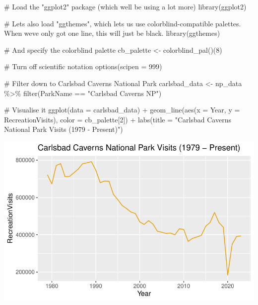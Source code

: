 \documentclass[
  letterpaper,
  DIV=11,
  numbers=noendperiod]{scrartcl}
\newenvironment{Shaded}{\begin{snugshade}}{\end{snugshade}}
\newcommand{\AttributeTok}[1]{\textcolor[rgb]{0.40,0.45,0.13}{#1}}
\newcommand{\CommentTok}[1]{\textcolor[rgb]{0.37,0.37,0.37}{#1}}
\newcommand{\DecValTok}[1]{\textcolor[rgb]{0.68,0.00,0.00}{#1}}
\newcommand{\FunctionTok}[1]{\textcolor[rgb]{0.28,0.35,0.67}{#1}}
\newcommand{\NormalTok}[1]{\textcolor[rgb]{0.00,0.23,0.31}{#1}}
\newcommand{\OtherTok}[1]{\textcolor[rgb]{0.00,0.23,0.31}{#1}}
\newcommand{\SpecialCharTok}[1]{\textcolor[rgb]{0.37,0.37,0.37}{#1}}
\newcommand{\StringTok}[1]{\textcolor[rgb]{0.13,0.47,0.30}{#1}}
\begin{document}
\begin{Shaded}
\begin{Highlighting}[]
\CommentTok{\# Load the "ggplot2" package (which we\textquotesingle{}ll be using a lot more)}
\FunctionTok{library}\NormalTok{(ggplot2)}

\CommentTok{\# Let\textquotesingle{}s also load "ggthemes", which let\textquotesingle{}s us use colorblind{-}compatible palettes. When we\textquotesingle{}ve only got one line, this will just be black.}
\FunctionTok{library}\NormalTok{(ggthemes)}

\CommentTok{\# And specify the colorblind palette}
\NormalTok{cb\_palette }\OtherTok{\textless{}{-}} \FunctionTok{colorblind\_pal}\NormalTok{()(}\DecValTok{8}\NormalTok{)}

\CommentTok{\# Turn off scientific notation}
\FunctionTok{options}\NormalTok{(}\AttributeTok{scipen =} \DecValTok{999}\NormalTok{)}

\CommentTok{\# Filter down to Carlsbad Caverns National Park}
\NormalTok{carlsbad\_data }\OtherTok{\textless{}{-}}\NormalTok{ np\_data }\SpecialCharTok{\%\textgreater{}\%} \FunctionTok{filter}\NormalTok{(ParkName }\SpecialCharTok{==} \StringTok{"Carlsbad Caverns NP"}\NormalTok{)}

\CommentTok{\# Visualise it}
\FunctionTok{ggplot}\NormalTok{(}\AttributeTok{data =}\NormalTok{ carlsbad\_data) }\SpecialCharTok{+} 
  \FunctionTok{geom\_line}\NormalTok{(}\FunctionTok{aes}\NormalTok{(}\AttributeTok{x =}\NormalTok{ Year, }\AttributeTok{y =}\NormalTok{ RecreationVisits), }\AttributeTok{color =}\NormalTok{ cb\_palette[}\DecValTok{2}\NormalTok{]) }\SpecialCharTok{+} 
  \FunctionTok{labs}\NormalTok{(}\AttributeTok{title =} \StringTok{"Carlsbad Caverns National Park Visits (1979 {-} Present)"}\NormalTok{)}
\end{Highlighting}
\end{Shaded}

\includegraphics{with-tabs_files/figure-pdf/unnamed-chunk-3-1.pdf}
\end{document}
